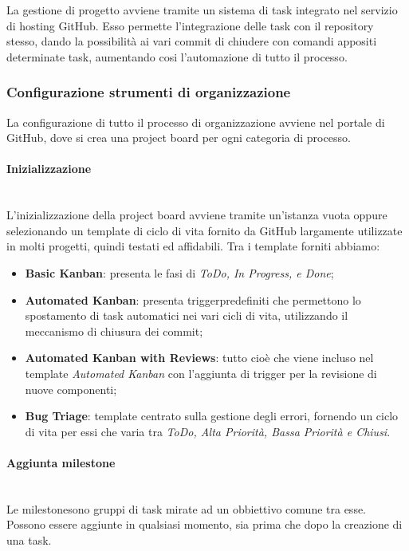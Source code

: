 La gestione di progetto avviene tramite un sistema di task integrato nel servizio di hosting GitHub. 
Esso permette l'integrazione delle task con il repository stesso, dando la possibilità ai vari commit di chiudere con comandi appositi determinate task, aumentando cosi l'automazione di tutto il processo. 

\subsubsection{Configurazione strumenti di organizzazione}
	La configurazione di tutto il processo di organizzazione avviene nel portale di GitHub, dove si crea una project board per ogni categoria di processo. 	

\paragraph{Inizializzazione} \-\\
 L'inizializzazione della project board avviene tramite un'istanza vuota oppure selezionando un template di ciclo di vita fornito da GitHub largamente utilizzate in molti progetti, quindi testati ed affidabili. Tra i template forniti abbiamo: 

\begin{itemize}
		\item \textbf{Basic Kanban}: presenta le fasi di \textit{ToDo, In Progress, e Done}; 
		\item \textbf{Automated Kanban}: presenta trigger\glossario predefiniti che permettono lo spostamento di task
		 automatici nei vari cicli di vita, utilizzando il meccanismo di chiusura dei commit;
		\item \textbf{Automated Kanban with Reviews}: tutto cioè che viene incluso nel template \textit{Automated Kanban} con l'aggiunta di trigger per la revisione di nuove componenti; 
		\item \textbf{Bug Triage}: template centrato sulla gestione degli errori, fornendo un ciclo di vita per essi che varia tra \textit{ToDo, Alta Priorità, Bassa Priorità e Chiusi}. 
\end{itemize}
	  	
\paragraph{Aggiunta milestone} \-\\
	Le milestone\glossario sono gruppi di task mirate ad un obbiettivo comune tra esse.
	Possono essere aggiunte in qualsiasi momento, sia prima che dopo la creazione di una task.


